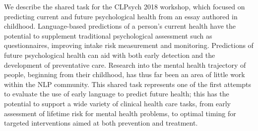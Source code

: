 We describe the shared task for the CLPsych 2018 workshop, which focused on predicting current and future psychological health from an essay authored in childhood. Language-based predictions of a person's current health have the potential to supplement traditional psychological assessment such as questionnaires, improving intake risk measurement and monitoring. Predictions of future psychological health can aid with both early detection and the development of preventative care. Research into the mental health trajectory of people, beginning from their childhood, has thus far been an area of little work within the NLP community. This shared task represents one of the first attempts to evaluate the use of early language to predict future health; this has the potential to support a wide variety of clinical health care tasks, from early assessment of lifetime risk for mental health problems, to optimal timing for targeted interventions aimed at both prevention and treatment.
